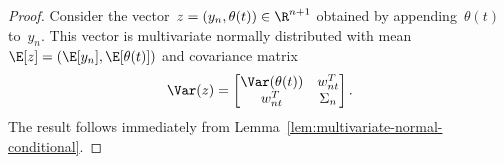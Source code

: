 \begin{proof}
    Consider the vector~$z=(y_n,\theta(t))\in\R^{n+1}$ obtained by appending~$\theta(t)$ to~$y_n$.
    This vector is multivariate normally distributed with mean~$\E[z]=(\E[y_n],\E[\theta(t)])$ and covariance matrix
    \[ \Var(z)=\begin{bmatrix}
        \Var(\theta(t)) & w_{nt}^T \\
        w_{nt}^T & \Sigma_n
    \end{bmatrix}. \]
    The result follows immediately from Lemma~\ref{lem:multivariate-normal-conditional}.
\end{proof}

